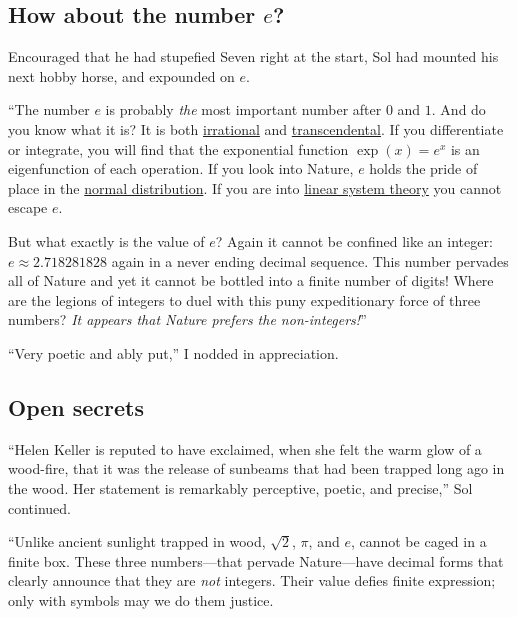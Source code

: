 \documentclass[
  a4paper,
]{article}
\begin{document}
\subsection{\texorpdfstring{How about the number
\(e\)?}{How about the number e?}}\label{how-about-the-number-e}

Encouraged that he had stupefied Seven right at the start, Sol had
mounted his next hobby horse, and expounded on \(e\).

``The number \(e\) is probably \emph{the} most important number after
\(0\) and \(1\). And do you know what it is? It is both
\href{https://mathworld.wolfram.com/IrrationalNumber.html}{irrational}
and
\href{https://en.wikipedia.org/wiki/Transcendental_number}{transcendental}.
If you differentiate or integrate, you will find that the exponential
function \(\exp(x) = e^x\) is an eigenfunction of each operation. If you
look into Nature, \(e\) holds the pride of place in the
\href{https://www.khanacademy.org/math/statistics-probability/modeling-distributions-of-data/normal-distributions-library/a/normal-distributions-review}{normal
distribution}. If you are into
\href{https://www.cns.nyu.edu/~david/handouts/linear-systems/linear-systems.html}{linear
system theory} you cannot escape \(e\).

But what exactly is the value of \(e\)? Again it cannot be confined like
an integer: \(e \approx 2.718281828\) again in a never ending decimal
sequence. This number pervades all of Nature and yet it cannot be
bottled into a finite number of digits! Where are the legions of
integers to duel with this puny expeditionary force of three numbers?
\emph{It appears that Nature prefers the non-integers!}''

``Very poetic and ably put,'' I nodded in appreciation.

\subsection{Open secrets}\label{open-secrets}

``Helen Keller is reputed to have exclaimed, when she felt the warm glow
of a wood-fire, that it was the release of sunbeams that had been
trapped long ago in the wood. Her statement is remarkably perceptive,
poetic, and precise,'' Sol continued.

``Unlike ancient sunlight trapped in wood, \(\sqrt{2}\), \(\pi\), and
\(e\), cannot be caged in a finite box. These three numbers---that
pervade Nature---have decimal forms that clearly announce that they are
\emph{not} integers. Their value defies finite expression; only with
symbols may we do them justice.
\end{document}

